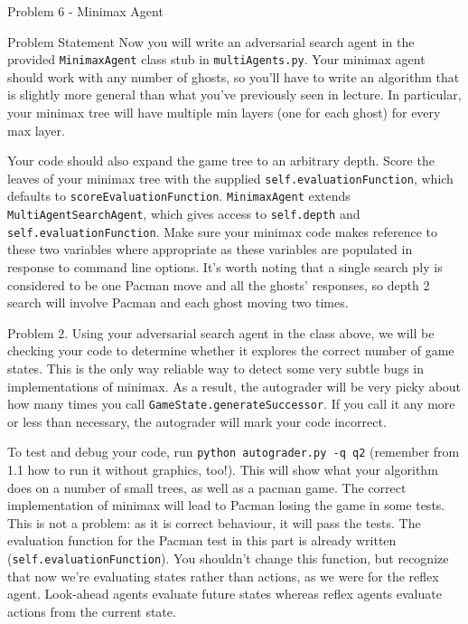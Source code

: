 \begin{problem}{Problem 6 - Minimax Agent}
    \begin{statement}{Problem Statement}
        Now you will write an adversarial search agent in the provided \texttt{MinimaxAgent} class stub in \texttt{multiAgents.py}. Your minimax agent should work with any number of ghosts, so you'll have to 
        write an algorithm that is slightly more general than what you've previously seen in lecture. In particular, your minimax tree will have multiple min layers (one for each ghost) for every max layer.

        Your code should also expand the game tree to an arbitrary depth. Score the leaves of your minimax tree with the supplied \texttt{self.evaluationFunction}, which defaults to \texttt{scoreEvaluationFunction}. 
        \texttt{MinimaxAgent} extends \texttt{MultiAgentSearchAgent}, which gives access to \texttt{self.depth} and \texttt{self.evaluationFunction}. Make sure your minimax code makes reference to these two 
        variables where appropriate as these variables are populated in response to command line options. It's worth noting that a single search ply is considered to be one Pacman move and all the ghosts' 
        responses, so depth 2 search will involve Pacman and each ghost moving two times.

        \begin{center}
            \begin{highlightenv}[15cm]
                Problem 2. Using your adversarial search agent in the class above, we will be checking your code to determine whether it explores the correct number of game states. This is the only way 
                reliable way to detect some very subtle bugs in implementations of minimax. As a result, the autograder will be very picky about how many times you call \texttt{GameState.generateSuccessor}. 
                If you call it any more or less than necessary, the autograder will mark your code incorrect.
            \end{highlightenv}
        \end{center}

        To test and debug your code, run \texttt{python autograder.py -q q2} (remember from 1.1 how to run it without graphics, too!). This will show what your algorithm does on a number of small trees, as 
        well as a pacman game. The correct implementation of minimax will lead to Pacman losing the game in some tests. This is not a problem: as it is correct behaviour, it will pass the tests. The 
        evaluation function for the Pacman test in this part is already written (\texttt{self.evaluationFunction}). You shouldn't change this function, but recognize that now we're evaluating states rather 
        than actions, as we were for the reflex agent. Look-ahead agents evaluate future states whereas reflex agents evaluate actions from the current state.


\end{statement}
\end{problem}
